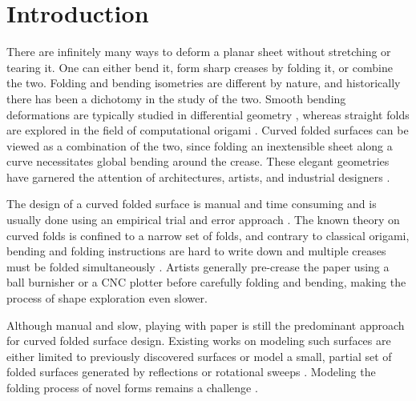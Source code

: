 

\section{Introduction}
There are infinitely many ways to deform a planar sheet without stretching or tearing it. One can either bend it, form sharp creases by folding it, or combine the two. Folding and bending isometries are different by nature, and historically there has been a dichotomy in the study of the two. Smooth bending deformations are typically studied in differential geometry \cite{do_carmo}, whereas straight folds are  explored in the field of computational origami \cite{origami_book}. Curved folded surfaces \cite{huffman} can be viewed as a combination of the two, since folding an inextensible sheet along a curve necessitates global bending around the crease. These elegant geometries have garnered the attention of architectures, artists, and industrial designers \cite{arch_geom,tachi2013composite,tachi2011one,buri2011curved,robofold,curved_review}. 

The design of a curved folded surface is manual and time consuming and is usually done using an empirical trial and error approach \cite{curved_review,huffmann_reconstructing}. The known theory on curved folds is confined to a narrow set of folds, and contrary to classical origami, bending and folding instructions are hard to write down and multiple creases must be folded simultaneously \cite{StringActuated:2017}. Artists generally pre-crease the paper using a ball burnisher or a CNC plotter before carefully folding and bending, making the process of shape exploration even slower. 

Although manual and slow, playing with paper is still the predominant approach for curved folded surface design. Existing works on modeling such surfaces are either limited to previously discovered surfaces \cite{curved_folding_kilian,StringActuated:2017} or model a small, partial set of folded surfaces generated by reflections or rotational sweeps \cite{Mitani_ref,mitani2009design}. Modeling the folding process of novel forms remains a challenge \cite{curved_review}. 

